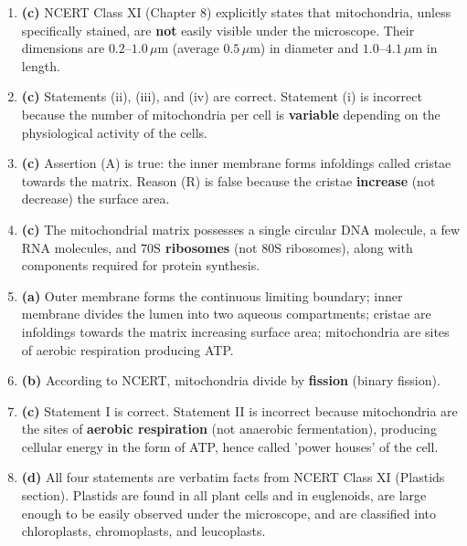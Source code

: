 \documentclass[11pt, a4paper]{article}
\begin{document}
\begin{enumerate}[label=\textbf{\arabic*.}, leftmargin=*, itemsep=6pt]

    \item \textbf{(c)} NCERT Class XI (Chapter 8) explicitly states that mitochondria, unless specifically stained, are \textbf{not} easily visible under the microscope. Their dimensions are $0.2\text{--}1.0\,\mu\text{m}$ (average $0.5\,\mu\text{m}$) in diameter and $1.0\text{--}4.1\,\mu\text{m}$ in length.

    \item \textbf{(c)} Statements (ii), (iii), and (iv) are correct. Statement (i) is incorrect because the number of mitochondria per cell is \textbf{variable} depending on the physiological activity of the cells.

    \item \textbf{(c)} Assertion (A) is true: the inner membrane forms infoldings called cristae towards the matrix. Reason (R) is false because the cristae \textbf{increase} (not decrease) the surface area.

    \item \textbf{(c)} The mitochondrial matrix possesses a single circular DNA molecule, a few RNA molecules, and \textbf{$70\text{S}$ ribosomes} (not $80\text{S}$ ribosomes), along with components required for protein synthesis.

    \item \textbf{(a)} Outer membrane forms the continuous limiting boundary; inner membrane divides the lumen into two aqueous compartments; cristae are infoldings towards the matrix increasing surface area; mitochondria are sites of aerobic respiration producing ATP.

    \item \textbf{(b)} According to NCERT, mitochondria divide by \textbf{fission} (binary fission).

    \item \textbf{(c)} Statement I is correct. Statement II is incorrect because mitochondria are the sites of \textbf{aerobic respiration} (not anaerobic fermentation), producing cellular energy in the form of ATP, hence called 'power houses' of the cell.

    \item \textbf{(d)} All four statements are verbatim facts from NCERT Class XI (Plastids section). Plastids are found in all plant cells and in euglenoids, are large enough to be easily observed under the microscope, and are classified into chloroplasts, chromoplasts, and leucoplasts.


\end{enumerate}
\end{document}
